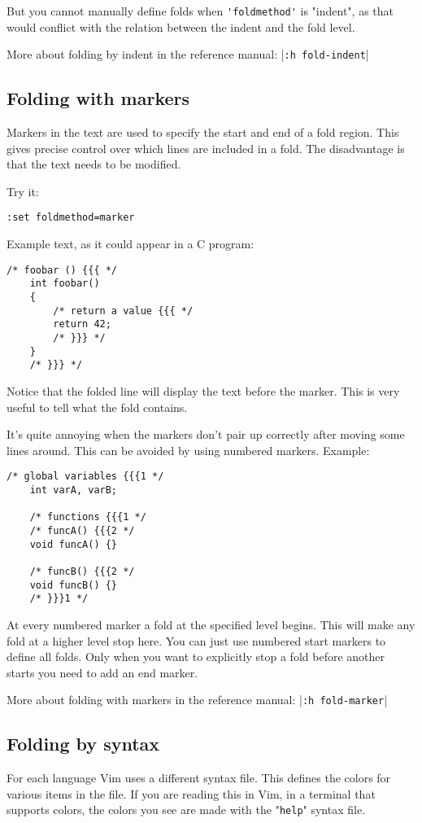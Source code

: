 But you cannot manually define folds when \verb!'foldmethod'! is "indent", as that would conflict with the relation between the indent and the fold level.

More about folding by indent in the reference manual: |\verb!:h fold-indent!|
\subsection{Folding with markers}
Markers in the text are used to specify the start and end of a fold region.
This gives precise control over which lines are included in a fold.
The disadvantage is that the text needs to be modified.

Try it:

\begin{Verbatim}[samepage=true]
 :set foldmethod=marker
\end{Verbatim}

Example text, as it could appear in a C program:

\begin{Verbatim}[samepage=true]
    /* foobar () {{{ */
    int foobar()
    {
        /* return a value {{{ */
        return 42;
        /* }}} */
    }
    /* }}} */
\end{Verbatim}

Notice that the folded line will display the text before the marker.
This is very useful to tell what the fold contains.

It's quite annoying when the markers don't pair up correctly after moving some lines around.
This can be avoided by using numbered markers.
Example:

\begin{Verbatim}[samepage=true]
    /* global variables {{{1 */
    int varA, varB;

    /* functions {{{1 */
    /* funcA() {{{2 */
    void funcA() {}

    /* funcB() {{{2 */
    void funcB() {}
    /* }}}1 */
\end{Verbatim}

At every numbered marker a fold at the specified level begins.
This will make any fold at a higher level stop here.
You can just use numbered start markers to define all folds.
Only when you want to explicitly stop a fold before another starts you need to add an end marker.

More about folding with markers in the reference manual: |\verb!:h fold-marker!|
\subsection{Folding by syntax}
For each language Vim uses a different syntax file.
This defines the colors for various items in the file.
If you are reading this in Vim, in a terminal that supports colors, the colors you see are made with the "\verb!help!" syntax file.


